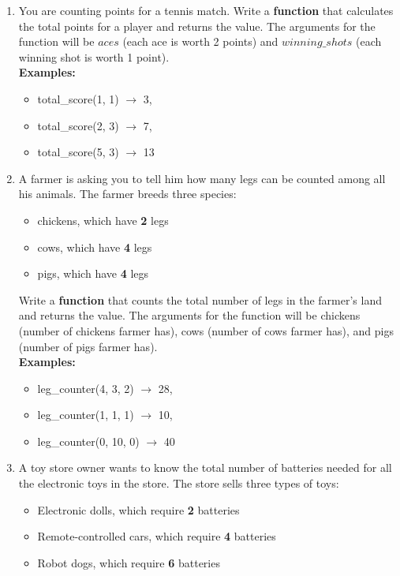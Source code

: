 \documentclass{article}
\begin{document}
\begin{enumerate}
	\item 
		You are counting points for a tennis match. Write a \textbf{function} that 
		calculates the total points for a player and returns the value. The arguments for the function will be 
		$aces$ (each ace is worth 2 points) and $winning\_shots$ (each winning shot is worth 1 point).\\

	\textbf{Examples:}
	\begin{itemize}
		\item total\_score(1, 1) $\rightarrow$ 3, 
		\item total\_score(2, 3) $\rightarrow$ 7, 
		\item total\_score(5, 3) $\rightarrow$ 13
	\end{itemize}

	\item 
		A farmer is asking you to tell him how many legs can be counted among all his animals. 
		The farmer breeds three species:
		\begin{itemize}
			\item chickens, which have \textbf{2} legs
			\item cows, which have \textbf{4} legs
			\item pigs, which have \textbf{4} legs
		\end{itemize}
		Write a \textbf{function} that counts the total number of legs in the farmer's land and returns the value. 
		The arguments for the function will be chickens (number of chickens farmer has), cows (number of cows farmer has), and pigs (number of pigs farmer has).\\

	\textbf{Examples:}
	\begin{itemize}
		\item  leg\_counter(4, 3, 2) $\rightarrow$ 28, 
		\item  leg\_counter(1, 1, 1) $\rightarrow$ 10, 
		\item  leg\_counter(0, 10, 0) $\rightarrow$ 40 
	\end{itemize}

	\item 
		A toy store owner wants to know the total number of batteries needed for all the electronic toys in the store. 
		The store sells three types of toys:
		\begin{itemize}
			\item Electronic dolls, which require \textbf{2} batteries
			\item Remote-controlled cars, which require \textbf{4} batteries
			\item Robot dogs, which require \textbf{6} batteries
		\end{itemize}



\end{enumerate}
\end{document}
